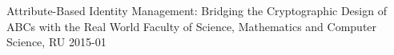\begin{multicols}{2}
%
%
%
%
%
%
%
%
%
%
%
%
%
%
%


         {Attribute-Based Identity Management: Bridging the Cryptographic Design of ABCs with the Real World}
         {Faculty of Science, Mathematics and Computer Science, RU}
         {2015-01}


\end{multicols}
